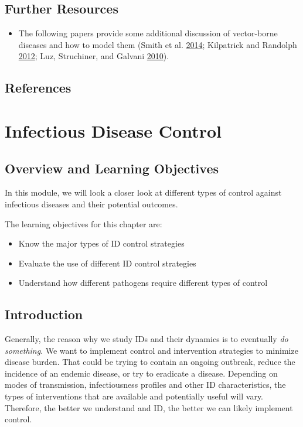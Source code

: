 \documentclass[]{article}
\providecommand{\tightlist}{%
  \setlength{\itemsep}{0pt}\setlength{\parskip}{0pt}}
\theoremstyle{definition}
\theoremstyle{definition}
\theoremstyle{definition}
\theoremstyle{remark}
\begin{document}
\subsection{Further Resources}\label{further-resources-7}

\begin{itemize}
\tightlist
\item
  The following papers provide some additional discussion of
  vector-borne diseases and how to model them (Smith et al.
  \protect\hyperlink{ref-smith14}{2014}; Kilpatrick and Randolph
  \protect\hyperlink{ref-kilpatrick12}{2012}; Luz, Struchiner, and
  Galvani \protect\hyperlink{ref-luz10}{2010}).
\end{itemize}

\subsection{References}\label{references-8}

\section{Infectious Disease Control}\label{infectious-disease-control}

\subsection{Overview and Learning
Objectives}\label{overview-and-learning-objectives-8}

In this module, we will look a closer look at different types of control
against infectious diseases and their potential outcomes.

The learning objectives for this chapter are:

\begin{itemize}
\tightlist
\item
  Know the major types of ID control strategies
\item
  Evaluate the use of different ID control strategies
\item
  Understand how different pathogens require different types of control
\end{itemize}

\subsection{Introduction}\label{introduction-8}

Generally, the reason why we study IDs and their dynamics is to
eventually \emph{do something}. We want to implement control and
intervention strategies to minimize disease burden. That could be trying
to contain an ongoing outbreak, reduce the incidence of an endemic
disease, or try to eradicate a disease. Depending on modes of
transmission, infectiousness profiles and other ID characteristics, the
types of interventions that are available and potentially useful will
vary. Therefore, the better we understand and ID, the better we can
likely implement control.
\end{document}

